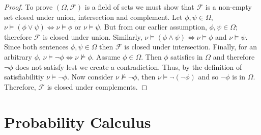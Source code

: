 \documentclass{amsart}
\theoremstyle{plain}
\begin{document}
\begin{proof}
  To prove $(\Omega,\mathcal{F})$ is a field of sets we must show that $\mathcal{F}$ is a non-empty
  set closed under union, intersection and complement. Let $\phi,\psi \in \Omega$, $\nu \models
  (\phi \vee \psi) \iff \nu \models \phi$ or $\nu \models \psi$. But from our earlier assumption,
  $\phi,\psi \in \Omega$; therefore $\mathcal{F}$ is closed under union. Similarly, $\nu \models
  (\phi \wedge \psi) \iff \nu \models \phi$ and $\nu \models \psi$. Since both sentences $\phi,\psi
  \in \Omega$ then $\mathcal{F}$ is closed under intersection. Finally, for an arbitrary $\phi$,
  $\nu \models \neg \phi \iff \nu \not\models \phi$. Assume $\phi \in \Omega$. Then $\phi$
  satisfies in $\Omega$ and therefore $\neg\phi$ does not satisfy lest we create a contradiction.
  Thus, by the definition of satisfiabilitiy $\nu \models \neg\phi$. Now consider $\nu \not\models
  \neg\phi$, then $\nu \models \neg(\neg\phi)$ and so $\neg\phi$ is in $\Omega$. Therefore,
  $\mathcal{F}$ is closed under complements.
\end{proof}

\section{Probability Calculus}



\newpage

\printbibliography[]
\end{document}
